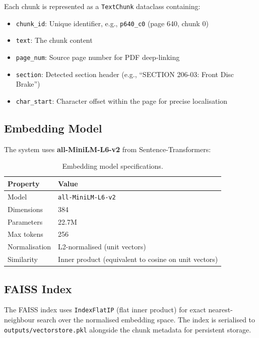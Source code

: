 \documentclass[12pt, a4paper]{article}
\begin{document}
Each chunk is represented as a \texttt{TextChunk} dataclass containing:
\begin{itemize}[itemsep=1pt]
  \item \texttt{chunk\_id}: Unique identifier, e.g., \texttt{p640\_c0} (page 640, chunk 0)
  \item \texttt{text}: The chunk content
  \item \texttt{page\_num}: Source page number for PDF deep-linking
  \item \texttt{section}: Detected section header (e.g., ``SECTION 206-03: Front Disc Brake'')
  \item \texttt{char\_start}: Character offset within the page for precise localisation
\end{itemize}

\subsection{Embedding Model}

The system uses \textbf{all-MiniLM-L6-v2} from Sentence-Transformers:

\begin{table}[H]
\centering
\caption{Embedding model specifications.}
\begin{tabular}{l l}
\toprule
\textbf{Property} & \textbf{Value} \\
\midrule
Model       & \texttt{all-MiniLM-L6-v2} \\
Dimensions  & 384 \\
Parameters  & 22.7M \\
Max tokens  & 256 \\
Normalisation & L2-normalised (unit vectors) \\
Similarity  & Inner product (equivalent to cosine on unit vectors) \\
\bottomrule
\end{tabular}
\end{table}

\subsection{FAISS Index}

The FAISS index uses \texttt{IndexFlatIP} (flat inner product) for exact nearest-neighbour search over the normalised embedding space. The index is serialised to \texttt{outputs/vectorstore.pkl} alongside the chunk metadata for persistent storage.

\end{document}
